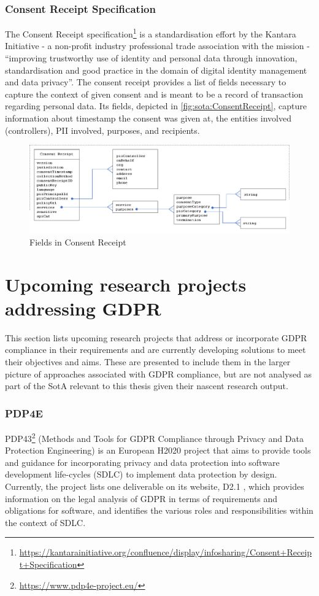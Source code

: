 \subsubsection{Consent Receipt Specification}
The Consent Receipt specification\footnote{\url{https://kantarainitiative.org/confluence/display/infosharing/Consent+Receipt+Specification}} \cite{lizar_consent_2017} is a standardisation effort by the Kantara Initiative - a non-profit industry professional trade association with the mission - ``improving trustworthy use of identity and personal data through innovation, standardisation and good practice in the domain of digital identity management and data privacy''. The consent receipt provides a list of fields necessary to capture the context of given consent and is meant to be a record of transaction regarding personal data. Its fields, depicted in \autoref{fig:sota:ConsentReceipt}, capture information about timestamp the consent was given at, the entities involved (controllers), PII involved, purposes, and recipients.
\begin{figure}[htbp]
    \centering
    \includegraphics[width=\linewidth]{img/ConsentReceipt.png}
    \caption{Fields in Consent Receipt \cite{lizar_consent_2017}}
    \label{fig:sota:ConsentReceipt}
\end{figure}

\section{Upcoming research projects addressing GDPR}
This section lists upcoming research projects that address or incorporate GDPR compliance in their requirements and are currently developing solutions to meet their objectives and aims. These are presented to include them in the larger picture of approaches associated with GDPR compliance, but are not analysed as part of the SotA relevant to this thesis given their nascent research output.

\subsubsection{PDP4E}
PDP43\footnote{\url{https://www.pdp4e-project.eu/}} (Methods and Tools for GDPR Compliance through Privacy and Data Protection Engineering) is an European H2020 project that aims to provide tools and guidance for incorporating privacy and data protection into software development life-cycles (SDLC) to implement data protection by design. Currently, the project lists one deliverable on its website, D2.1 \cite{noauthor_pdp4e-d2.1_multistakeholder_nodate}, which provides information on the legal analysis of GDPR in terms of requirements and obligations for software, and identifies the various roles and responsibilities within the context of SDLC.

